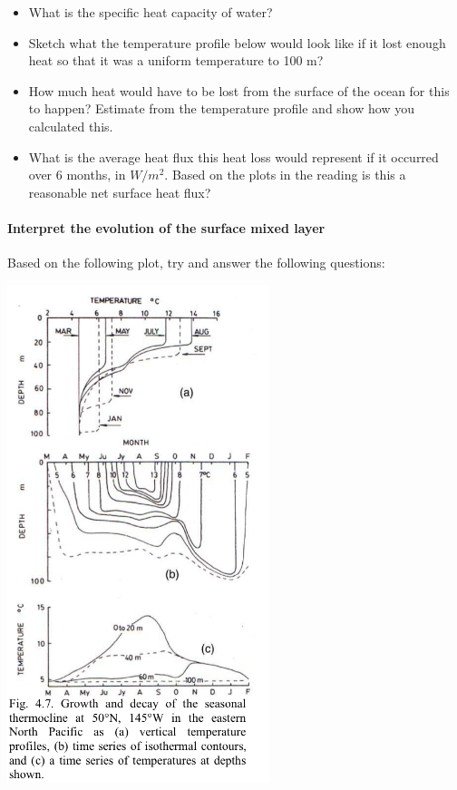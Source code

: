 \begin{itemize}
    \item What is the specific heat capacity of water?
    \item Sketch what the temperature profile below would look like if it lost enough heat so that it was a uniform temperature to 100 m?
\item How much heat would have to be lost from the surface of the ocean for this to happen? Estimate from the temperature profile and show how you calculated this.
\item What is the average heat flux this heat loss would represent if it occurred over 6 months, in $W/m^2$. Based on the plots in the reading is this a reasonable net surface heat flux?
\end{itemize}

\paragraph{Interpret the evolution of the surface mixed layer}

Based on the following plot, try and answer the following questions:

\includegraphics[width=3in]{figs/FluxesFigs/MixedLayerPapa}

